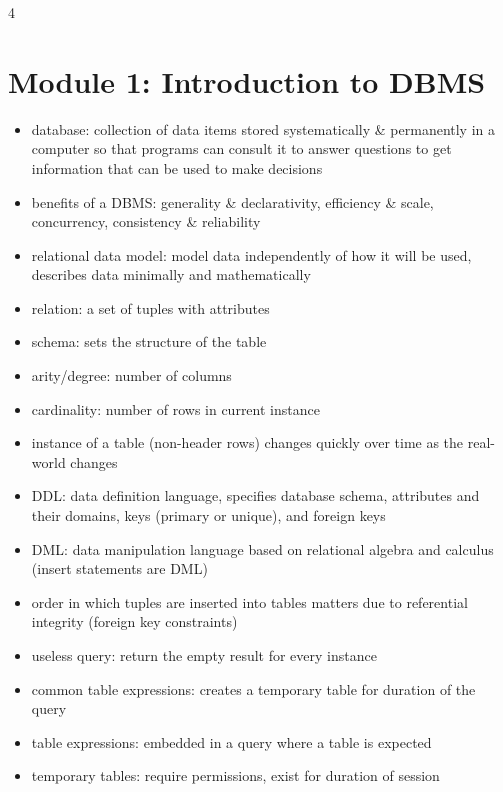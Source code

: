 \documentclass[8pt,landscape]{article}
\begin{document}
	\small 
	\begin{multicols*}{4}
		\section*{Module 1: Introduction to DBMS}
		\begin{itemize}[leftmargin=*]
      \item database: collection of data items stored systematically \& permanently in a computer so that programs can consult it to answer questions to get information that can be used to make decisions
      \item benefits of a DBMS: generality \& declarativity, efficiency \& scale, concurrency, consistency \& reliability
      \item relational data model: model data independently of how it will be used, describes data minimally and mathematically
      \item relation: a set of tuples with attributes
      \item schema: sets the structure of the table
      \item arity/degree: number of columns
      \item cardinality: number of rows in current instance
      \item instance of a table (non-header rows) changes quickly over time as the real-world changes
      \item DDL: data definition language, specifies database schema, attributes and their domains, keys (primary or unique), and foreign keys
      \item DML: data manipulation language based on relational algebra and calculus (insert statements are DML)
      \item order in which tuples are inserted into tables matters due to referential integrity (foreign key constraints)
      \item useless query: return the empty result for every instance
      \item common table expressions: creates a temporary table for duration of the query
      \item table expressions: embedded in a query where a table is expected
      \item temporary tables: require permissions, exist for duration of session
		\end{itemize}

\end{multicols*}
\end{document}
